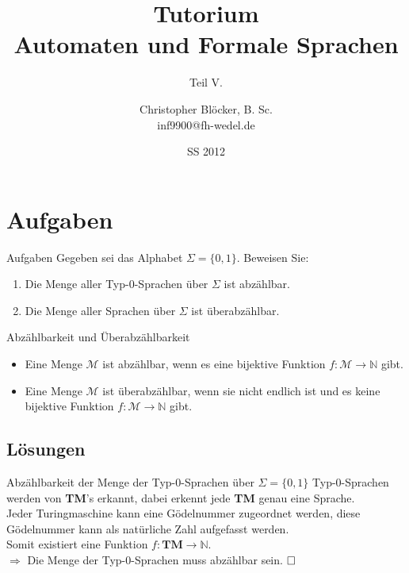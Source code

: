 \documentclass[]{beamer}
\author[Christopher Blöcker, B. Sc.]{Christopher Blöcker, B. Sc.\\ inf9900@fh-wedel.de}
\title[AFS Tutorium]{Tutorium\\Automaten und Formale Sprachen}
\date{SS 2012}
\subtitle{Teil V.}
\begin{document}
\begin{frame}
  \titlepage
\end{frame}

\section{Aufgaben}
\begin{frame}[squeeze]{}
  \begin{alertblock}{Aufgaben}
    Gegeben sei das Alphabet $\Sigma = \{0, 1\}$. Beweisen Sie:
    \begin{enumerate}
      \item Die Menge aller Typ-0-Sprachen über $\Sigma$ ist abzählbar.
      \item Die Menge aller Sprachen über $\Sigma$ ist überabzählbar.
    \end{enumerate}
  \end{alertblock}
  
  \pause
  
  \begin{exampleblock}{Abzählbarkeit und Überabzählbarkeit}
    \begin{itemize}
      \item Eine Menge $\mathcal{M}$ ist abzählbar, wenn es eine bijektive Funktion $f : \mathcal{M} \to \mathbb{N}$ gibt.
      \item Eine Menge $\mathcal{M}$ ist überabzählbar, wenn sie nicht endlich ist und es keine bijektive Funktion $f : \mathcal{M} \to \mathbb{N}$ gibt.
    \end{itemize}
  \end{exampleblock}
\end{frame}

\subsection{Lösungen}
\begin{frame}[squeeze]{}
  \begin{block}{Abzählbarkeit der Menge der Typ-0-Sprachen über $\Sigma = \{0, 1\}$}
    Typ-0-Sprachen werden von \textbf{TM}'s erkannt, dabei erkennt jede \textbf{TM} genau eine Sprache. \\
    \pause
    \vspace*{0.5em}
    Jeder Turingmaschine kann eine Gödelnummer zugeordnet werden, diese Gödelnummer kann als natürliche Zahl aufgefasst werden. \\
    \pause
    \vspace*{0.5em}
    Somit existiert eine Funktion $f : \textbf{TM} \rightarrow \mathbb{N}$. \\
    \pause
    \vspace*{0.5em}
    $\Rightarrow$ Die Menge der Typ-0-Sprachen muss abzählbar sein. $\hfill \square$
  \end{block}
\end{frame}
\end{document}
